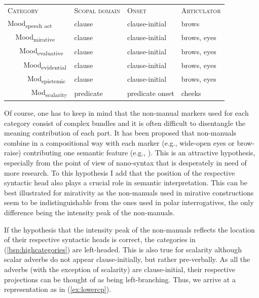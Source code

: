 \begin{exe}
\ex\label{bsp:highcategories} 
\begin{adjustbox}{max width=0.9\textwidth}
\begin{tabular}[t]{p{3.2cm}p{2.8cm}p{2.6cm}p{2.5cm}} %
\textsc{Category} & \textsc{Scopal domain} & \textsc{Onset} & \textsc{Articulator}  \\
Mood\textsubscript{speech act} & clause & clause-initial & brows \\
\textcolor{white}{nn}Mood\textsubscript{mirative} & clause & clause-initial & brows, eyes\\
\textcolor{white}{nnn}Mood\textsubscript{evaluative} & clause & clause-initial & brows, eyes \\
\textcolor{white}{nnnn}Mood\textsubscript{evidential} & clause & clause-initial & brows, eyes \\
\textcolor{white}{nnnnn}Mod\textsubscript{epistemic} & clause & clause-initial & brows, eyes \\
\textcolor{white}{nnnnnn}Mod\textsubscript{scalarity} & predicate & predicate onset & cheeks \\
\end{tabular}
\end{adjustbox}
\end{exe}

\noindent Of course, one has to keep in mind that the non-manual markers used for each category consist of complex bundles and it is often difficult to disentangle the meaning contribution of each part. It has been proposed that non-manuals combine in a compositional way with each marker (e.g., wide-open eyes or brow-raise) contributing one semantic feature (e.g., \citealt{herrmann2013modal}). This is an attractive hypothesis, especially from the point of view of nano-syntax that is desperately in need of more research. To this hypothesis I add that the position of the respective syntactic head also plays a crucial role in semantic interpretation. This can be best illustrated for mirativity as the non-manuals used in mirative constructions seem to be indistinguishable from the ones used in polar interrogatives, the only difference being the intensity peak of the non-manuals. 

If the hypothesis that the intensity peak of the non-manuals reflects the location of their respective syntactic heads is correct, the categories in (\ref{bsp:highcategories}) are left-headed. This is also true for scalarity although scalar adverbs do not appear clause-initially, but rather pre-verbally. As all the adverbs (with the exception of scalarity) are clause-initial, their respective projections can be thought of as being left-branching. Thus, we arrive at a representation as in (\ref{ex:lowercp}). 




